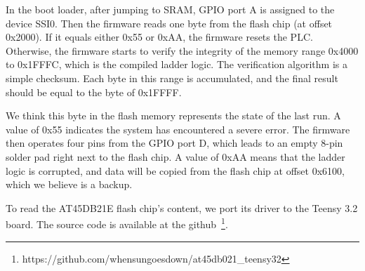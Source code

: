 



In the boot loader, after jumping to SRAM, GPIO port A is assigned to the device SSI0. Then the firmware reads one byte from the flash chip (at offset 0x2000). If it equals either 0x55 or 0xAA, the firmware resets the PLC. Otherwise, the firmware starts to verify the integrity of the memory range 0x4000 to 0x1FFFC, which is the compiled ladder logic. The verification algorithm is a simple checksum. Each byte in this range is accumulated, and the final result should be equal to the byte of 0x1FFFF.

We think this byte in the flash memory represents the state of the last run.  A value of 0x55 indicates the system has encountered a severe error. The firmware then operates four pins from the GPIO port D, which leads to an empty 8-pin solder pad right next to the flash chip.  A value of 0xAA means that the ladder logic is corrupted, and data will be copied from the flash chip at offset 0x6100, which we believe is a backup.

To read the AT45DB21E flash chip's content, we port its driver to the Teensy 3.2 board. The source code is available at the github~\footnote{https://github.com/whensungoesdown/at45db021\_teensy32}. 




